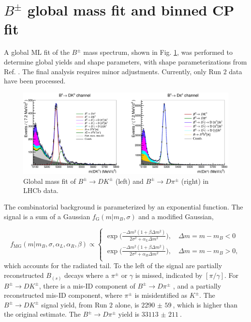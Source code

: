 \documentclass[12pt, a4paper, notitlepage, onecolumn]{article}
\begin{document}
\section{\texorpdfstring{$B^\pm$}{B} global mass fit and binned CP fit}
\noindent A global ML fit of the $B^\pm$ mass spectrum, shown in Fig. \ref{fig_Bmass_Global}, was performed to determine global yields and shape parameters, with shape parameterizations from Ref. \cite{cite_LHCbGGSZKSpipi}. The final analysis requires minor adjustments. Currently, only Run $2$ data have been processed.

\begin{figure}[H] 
  \centering
  \includegraphics[width=1\textwidth]{Plots/GlobalFit.png}
  \caption{Global mass fit of $B^\pm\to DK^\pm$ (left) and $B^\pm\to D\pi^\pm$ (right) in LHCb data.}
  \label{fig_Bmass_Global}
\end{figure}

The combinatorial background is parameterized by an exponential function. The signal is a sum of a Gaussian $f_\text{G}(m|m_B, \sigma)$ and a modified Gaussian,

\begin{equation}
  f_\text{MG}(m|m_B, \sigma, \alpha_L, \alpha_R, \beta)\propto
  \begin{cases}
    \exp\Big(\frac{-\Delta m^2(1 + \beta\Delta m^2)}{2\sigma^2 + \alpha_L\Delta m^2}\Big), \quad \Delta m = m - m_B < 0 \\
    \exp\Big(\frac{-\Delta m^2(1 + \beta\Delta m^2)}{2\sigma^2 + \alpha_R\Delta m^2}\Big), \quad \Delta m = m - m_B > 0, \\
  \end{cases}
\end{equation}
which accounts for the radiated tail. To the left of the signal are partially reconstructed $B_{(s)}$ decays where a $\pi^\pm$ or $\gamma$ is missed, indicated by $[\pi/\gamma]$. For $B^\pm\to DK^\pm$, there is a mis-ID component of $B^\pm\to D\pi^\pm$ , and a partially reconstructed mis-ID component, where $\pi^\pm$ is misidentified as $K^\pm$. The $B^\pm\to DK^\pm$ signal yield, from Run $2$ alone, is $\SI{2290(59)}{}$, which is higher than the original estimate. The $B^\pm\to D\pi^\pm$ yield is $\SI{33113(211)}{}$.
\end{document}
